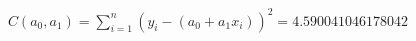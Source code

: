 \documentclass[preview]{standalone}
\begin{document}
\begin{align*}
C(a_0, a_1) = \sum_{i=1}^{n} (y_i - (a_0 + a_1x_i))^2 =4.590041046178042
\end{align*}
\end{document}
